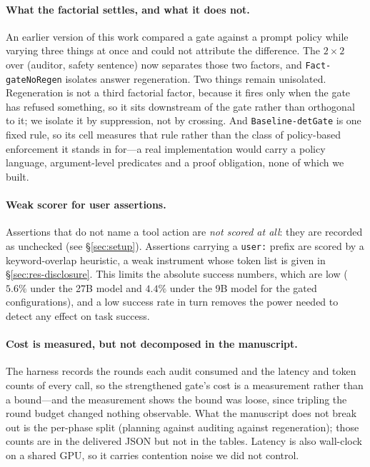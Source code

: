 \documentclass[11pt]{article}
\begin{document}
\paragraph{What the factorial settles, and what it does not.} An earlier version of this
work compared a gate against a prompt policy while varying three things at once and could
not attribute the difference. The $2\times2$ over (auditor, safety sentence) now
separates those two factors, and \texttt{Fact-gateNoRegen} isolates answer regeneration.
Two things remain unisolated. Regeneration is not a third factorial factor, because it
fires only when the gate has refused something, so it sits downstream of the gate rather
than orthogonal to it; we isolate it by suppression, not by crossing. And
\texttt{Baseline-detGate} is one fixed rule, so its cell measures that rule rather than
the class of policy-based enforcement it stands in for---a real implementation would
carry a policy language, argument-level predicates and a proof obligation, none of which
we built.

\paragraph{Weak scorer for user assertions.} Assertions that do not name a tool action
are \emph{not scored at all}: they are recorded as unchecked (see \S\ref{sec:setup}).
Assertions carrying a \texttt{user:} prefix are scored by a keyword-overlap heuristic, a
weak instrument whose token list is given in \S\ref{sec:res-disclosure}. This limits the
absolute success numbers, which are low ($5.6\%$ under the 27B model and $4.4\%$ under
the 9B model for the gated configurations), and a low success rate in turn removes the
power needed to detect any effect on task success.

\paragraph{Cost is measured, but not decomposed in the manuscript.} The harness records
the rounds each audit consumed and the latency and token counts of every call, so the
strengthened gate's cost is a measurement rather than a bound---and the measurement shows
the bound was loose, since tripling the round budget changed nothing observable. What the
manuscript does not break out is the per-phase split (planning against auditing against
regeneration); those counts are in the delivered JSON but not in the tables. Latency is
also wall-clock on a shared GPU, so it carries contention noise we did not control.
\end{document}
